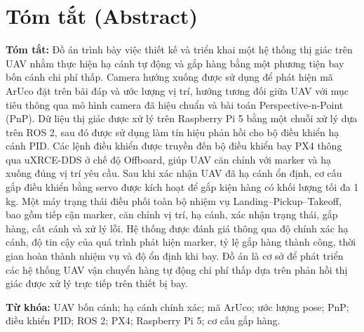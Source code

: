 \clearpage
\section*{Tóm tắt (Abstract)}

\noindent\textbf{Tóm tắt:} Đồ án trình bày việc thiết kế và triển khai một hệ thống thị giác trên UAV nhằm thực hiện hạ cánh tự động và gắp hàng bằng một phương tiện bay bốn cánh chi phí thấp. Camera hướng xuống được sử dụng để phát hiện mã ArUco đặt trên bãi đáp và ước lượng vị trí, hướng tương đối giữa UAV với mục tiêu thông qua mô hình camera đã hiệu chuẩn và bài toán Perspective-n-Point (PnP). Dữ liệu thị giác được xử lý trên Raspberry Pi 5 bằng một chuỗi xử lý dựa trên ROS 2, sau đó được sử dụng làm tín hiệu phản hồi cho bộ điều khiển hạ cánh PID. Các lệnh điều khiển được truyền đến bộ điều khiển bay PX4 thông qua uXRCE-DDS ở chế độ Offboard, giúp UAV căn chỉnh với marker và hạ xuống đúng vị trí yêu cầu. Sau khi xác nhận UAV đã hạ cánh ổn định, cơ cấu gắp điều khiển bằng servo được kích hoạt để gắp kiện hàng có khối lượng tối đa 1 kg. Một máy trạng thái điều phối toàn bộ nhiệm vụ Landing--Pickup--Takeoff, bao gồm tiếp cận marker, căn chỉnh vị trí, hạ cánh, xác nhận trạng thái, gắp hàng, cất cánh và xử lý lỗi. Hệ thống được đánh giá thông qua độ chính xác hạ cánh, độ tin cậy của quá trình phát hiện marker, tỷ lệ gắp hàng thành công, thời gian hoàn thành nhiệm vụ và độ ổn định khi bay. Đồ án là cơ sở để phát triển các hệ thống UAV vận chuyển hàng tự động chi phí thấp dựa trên phản hồi thị giác được xử lý trực tiếp trên thiết bị bay.

\vspace{2mm}
\noindent\textbf{Từ khóa:} UAV bốn cánh; hạ cánh chính xác; mã ArUco; ước lượng pose; PnP; điều khiển PID; ROS 2; PX4; Raspberry Pi 5; cơ cấu gắp hàng.
